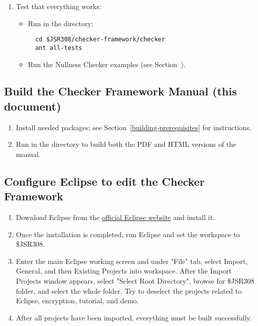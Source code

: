 \begin{enumerate}
\item Test that everything works:

  \begin{itemize}

  \item Run  in the  directory:
\begin{Verbatim}
  cd $JSR308/checker-framework/checker
  ant all-tests
\end{Verbatim}

  \item Run the Nullness Checker examples (see
    Section~).

  \end{itemize}

\end{enumerate}


\subsection{Build the Checker Framework Manual (this document)\label{building-manual}}

\begin{enumerate}
\item
Install needed packages; see Section~\ref{building-prerequisites} for
instructions.

\item
Run  in the  directory to build both the PDF and HTML versions of the manual.
\end{enumerate}

\subsection{Configure Eclipse to edit the Checker Framework\label{building-eclipse}}
\begin{enumerate}
\item Download Eclipse from the \href{https://www.eclipse.org/downloads}{official Eclipse website} and install it.
\item Once the installation is completed, run Eclipse and set the workspace to \$JSR308.
\item Enter the main Eclipse working screen and under "File" tab, select Import, General, and then Existing Projects into workspace. After the Import Projects window appears, select "Select Root Directory", browse for \$JSR308 folder, and select the whole folder. Try to deselect the projects related to Eclipse, encryption, tutorial, and demo.
\item After all projects have been imported, everything must be built successfully.
\end{enumerate}

